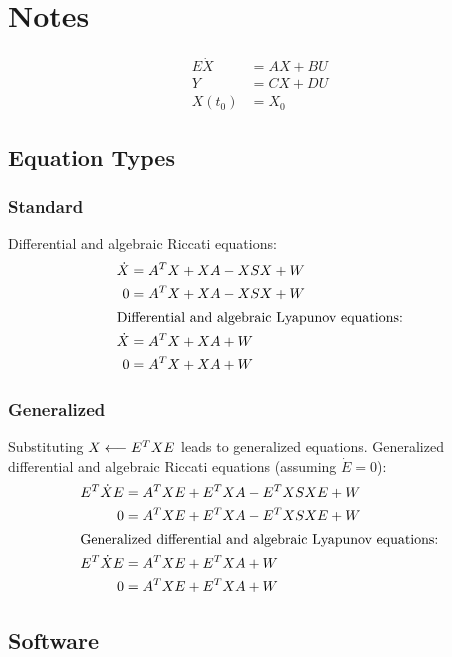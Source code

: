 \chapter{Notes}

\begin{align}
  E\dot{X} &= AX + BU \\
  Y &= CX + DU \\
  X(t_0) &= X_0
\end{align}

\section{Equation Types}
\subsection{Standard}

Differential and algebraic Riccati equations:
\begin{align}
  \dot{X} &= A^T X + XA - XSX + W \\
  0 &= A^T X + XA - XSX + W \\
\intertext{Differential and algebraic Lyapunov equations:}
  \dot{X} &= A^T X + XA + W \\
  0 &= A^T X + XA + W
\end{align}

\subsection{Generalized}

Substituting $X\longleftarrow E^T XE$ leads to generalized equations.
Generalized differential and algebraic Riccati equations (assuming $\dot E = 0$):
\begin{align}
  E^T \dot{X}E &= A^T XE + E^T XA - E^T XSXE + W \\
  0 &= A^T XE + E^T XA - E^T XSXE + W \\
\intertext{Generalized differential and algebraic Lyapunov equations:}
  E^T \dot{X}E &= A^T XE + E^T XA + W \\
  0 &= A^T XE + E^T XA + W \\
\end{align}

\cite{Lang2017}

\section{Software}

